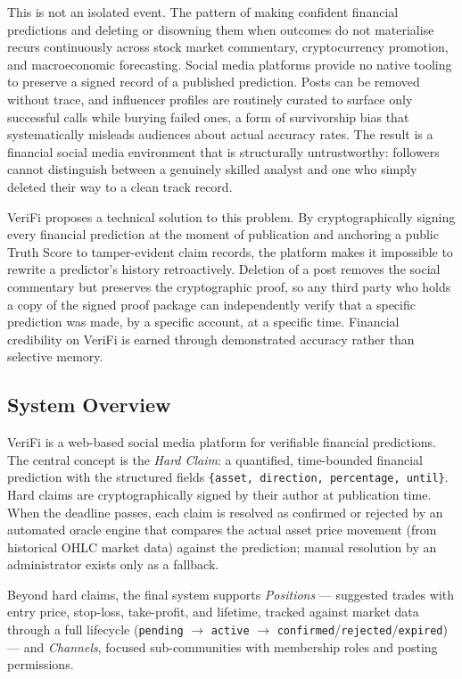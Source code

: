 \documentclass[a4paper,12pt]{report}
\begin{document}
This is not an isolated event. The pattern of making confident financial predictions and deleting or disowning them when outcomes do not materialise recurs continuously across stock market commentary, cryptocurrency promotion, and macroeconomic forecasting. Social media platforms provide no native tooling to preserve a signed record of a published prediction. Posts can be removed without trace, and influencer profiles are routinely curated to surface only successful calls while burying failed ones, a form of survivorship bias that systematically misleads audiences about actual accuracy rates. The result is a financial social media environment that is structurally untrustworthy: followers cannot distinguish between a genuinely skilled analyst and one who simply deleted their way to a clean track record.

VeriFi proposes a technical solution to this problem. By cryptographically signing every financial prediction at the moment of publication and anchoring a public Truth Score to tamper-evident claim records, the platform makes it impossible to rewrite a predictor's history retroactively. Deletion of a post removes the social commentary but preserves the cryptographic proof, so any third party who holds a copy of the signed proof package can independently verify that a specific prediction was made, by a specific account, at a specific time. Financial credibility on VeriFi is earned through demonstrated accuracy rather than selective memory.

\subsection{System Overview}

VeriFi is a web-based social media platform for verifiable financial predictions. The central concept is the \textit{Hard Claim}: a quantified, time-bounded financial prediction with the structured fields \texttt{\{asset,\allowbreak{} direction,\allowbreak{} percentage,\allowbreak{} until\}}. Hard claims are cryptographically signed by their author at publication time. When the deadline passes, each claim is resolved as confirmed or rejected by an automated oracle engine that compares the actual asset price movement (from historical OHLC market data) against the prediction; manual resolution by an administrator exists only as a fallback.

\begin{sloppypar}
Beyond hard claims, the final system supports \textit{Positions} --- suggested trades with entry price, stop-loss, take-profit, and lifetime, tracked against market data through a full lifecycle (\texttt{pending} $\rightarrow$ \texttt{active} $\rightarrow$ \texttt{confirmed}/\texttt{rejected}/\texttt{expired}) --- and \textit{Channels}, focused sub-communities with membership roles and posting permissions.
\end{sloppypar}
\end{document}
